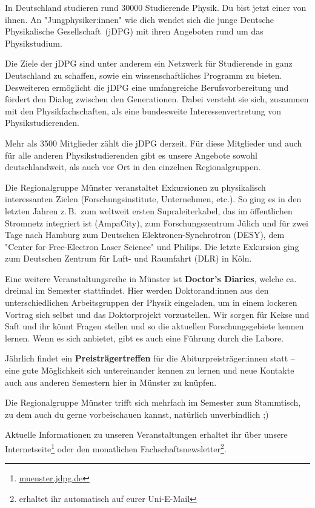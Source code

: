 \begin{multicols}{2}
In Deutschland studieren rund \num{30000} Studierende Physik.
Du bist jetzt einer von ihnen.
An "Jungphysiker:innen" wie dich wendet sich die junge Deutsche Physikalische Gesellschaft~(jDPG) mit ihren Angeboten rund um das Physikstudium.

Die Ziele der jDPG sind unter anderem ein Netzwerk für Studierende in ganz Deutschland zu schaffen, sowie ein wissenschaftliches Programm zu bieten.
Desweiteren ermöglicht die jDPG eine umfangreiche Berufsvorbereitung und fördert den Dialog zwischen den Generationen.
Dabei versteht sie sich, zusammen mit den Physikfachschaften, als eine bundesweite Interessenvertretung von Physikstudierenden.

Mehr als \num{3500} Mitglieder zählt die jDPG derzeit.
Für diese Mitglieder und auch für alle anderen Physikstudierenden gibt es unsere Angebote sowohl deutschlandweit, als auch vor Ort in den einzelnen Regionalgruppen.

Die Regionalgruppe Münster veranstaltet Exkursionen zu physikalisch interessanten Zielen (Forschungsinstitute, Unternehmen, etc.).
So ging es in den letzten Jahren z.\,B.\ zum weltweit ersten Supraleiterkabel, das im öffentlichen Stromnetz integriert ist (AmpaCity), zum Forschungszentrum Jülich und für zwei Tage nach Hamburg zum Deutschen Elektronen-Synchrotron (DESY), dem "Center for Free-Electron Laser Science" und Philips. Die letzte Exkursion ging zum Deutschen Zentrum für Luft- und Raumfahrt (DLR) in Köln.

Eine weitere Veranstaltungsreihe in Münster ist \textbf{Doctor's Diaries}, welche ca. dreimal im Semester stattfindet. Hier werden Doktorand:innen aus den unterschiedlichen Arbeitsgruppen der Physik eingeladen, um in einem lockeren Vortrag sich selbst und das Doktorprojekt vorzustellen. Wir sorgen für Kekse und Saft und ihr könnt Fragen stellen und so die aktuellen Forschungsgebiete kennen lernen. Wenn es sich anbietet, gibt es auch eine Führung durch die Labore. 

Jährlich findet ein \textbf{Preisträgertreffen} für die Abiturpreisträger:innen statt -- eine gute Möglichkeit sich untereinander kennen zu lernen und neue Kontakte auch aus anderen Semestern hier in Münster zu knüpfen.


Die Regionalgruppe Münster trifft sich mehrfach im Semester zum Stammtisch, zu dem auch du gerne vorbeischauen kannst, natürlich unverbindlich ;)


Aktuelle Informationen zu unseren Veranstaltungen erhaltet ihr über unsere Internetseite\footnote{\url{muenster.jdpg.de}} oder den monatlichen Fachschaftsnewsletter\footnote{erhaltet ihr automatisch auf eurer Uni-E-Mail}.


\end{multicols}

